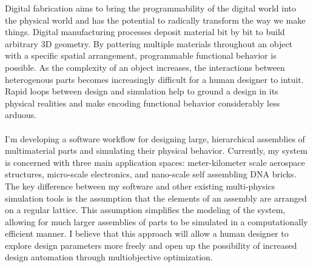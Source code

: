 % 
% 
%
Digital fabrication aims to bring the programmability of the digital world into the physical world and has the potential to radically transform the way we make things.  Digital manufacturing processes deposit material bit by bit to build arbitrary 3D geometry.  By pattering multiple materials throughout an object with a specific spatial arrangement, programmable functional behavior is possible.  As the complexity of an object increases, the interactions between heterogenous parts becomes increasingly difficult for a human designer to intuit.  Rapid loops between design and simulation help to ground a design in its physical realities and make encoding functional behavior considerably less arduous.\\
\\
I'm developing a software workflow for designing large, hierarchical assemblies of multimaterial parts and simulating their physical behavior.  Currently, my system is concerned with three main application spaces: meter-kilometer scale aerospace structures, micro-scale electronics, and nano-scale self assembling DNA bricks.  The key difference between my software and other existing multi-physics simulation tools is the assumption that the elements of an assembly are arranged on a regular lattice.  This assumption simplifies the modeling of the system, allowing for much larger assemblies of parts to be simulated in a computationally efficient manner.  I believe that this approach will allow a human designer to explore design parameters more freely and open up the possibility of increased design automation through multiobjective optimization.